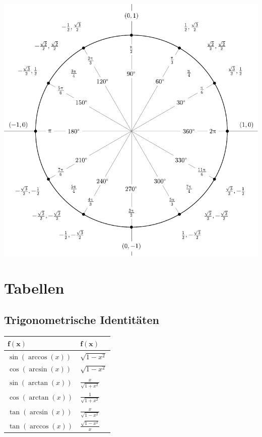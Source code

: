 \documentclass[a4paper,10pt]{article}
\begin{document}
\begin{center}
  \includegraphics[width=\linewidth]{include_degrees_circle.pdf}
\end{center}

\section{Tabellen}


\subsection{Trigonometrische Identitäten}
\begin{center}
 \begin{tabularx}{\linewidth}{>{\centering\arraybackslash}X>{\centering\arraybackslash}X}
  \toprule
  $\mathbf{f(x)}$ & $\mathbf{f(x)}$ \\
  \midrule
  $\sin(\arccos (x))$ & $\sqrt{1-x^2}$\\
  $\cos(\arcsin(x))$ & $\sqrt{1-x^2}$\\
  $\sin(\arctan(x))$ & $\frac{x}{\sqrt{1+x^2}}$\\
  $\cos(\arctan(x))$ & $\frac{1}{\sqrt{1+x^2}}$\\
  $\tan(\arcsin(x))$ & $\frac{x}{\sqrt{1-x^2}}$\\
  $\tan(\arccos(x))$ & $\frac{\sqrt{1-x^2}}{x}$\\
  \bottomrule
 \end{tabularx}
\end{center}
\end{document}
